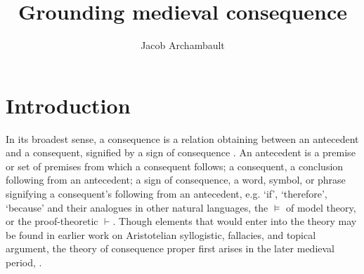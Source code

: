 \documentclass[a4paper, 11pt]{article}
\title{Grounding medieval consequence}
\author{Jacob Archambault}
\begin{document}
\maketitle


\begin{abstract}
\end{abstract}

\section{Introduction}

In its broadest sense, a consequence is a relation obtaining between an antecedent and a consequent, signified by a sign of consequence \autocite{StrodeConsequentiis,Green-Pedersen1980a}. An antecedent is a premise or set of premises from which a consequent follows; a consequent, a conclusion following from an antecedent; a sign of consequence, a word, symbol, or phrase signifying a consequent's following from an antecedent, e.g.  `if', `therefore', `because' and their analogues in other natural languages, the $\vDash$ of model theory, or the proof-theoretic $\vdash$. Though elements that would enter into the theory may be found in earlier work on Aristotelian syllogistic, fallacies, and topical argument, the theory of consequence proper first arises in the later medieval period, .
\end{document}

